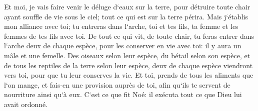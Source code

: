 \verse Et moi, je vais faire venir le déluge d`eaux sur la terre, pour détruire toute chair ayant souffle de vie sous le ciel; tout ce qui est sur la terre périra. 
\verse Mais j`établis mon alliance avec toi; tu entreras dans l`arche, toi et tes fils, ta femme et les femmes de tes fils avec toi. 
\verse De tout ce qui vit, de toute chair, tu feras entrer dans l`arche deux de chaque espèce, pour les conserver en vie avec toi: il y aura un mâle et une femelle. 
\verse Des oiseaux selon leur espèce, du bétail selon son espèce, et de tous les reptiles de la terre selon leur espèce, deux de chaque espèce viendront vers toi, pour que tu leur conserves la vie. 
\verse Et toi, prends de tous les aliments que l`on mange, et fais-en une provision auprès de toi, afin qu`ils te servent de nourriture ainsi qu`à eux. 
\verse C`est ce que fit Noé: il exécuta tout ce que Dieu lui avait ordonné. 

\chapter{}

